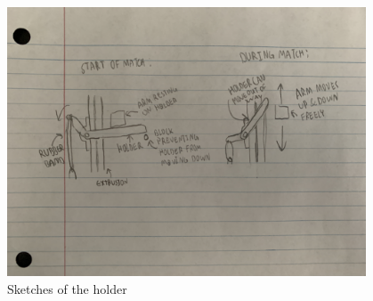\begin{figure}[htp]
\centering
  \includegraphics[width=0.95\textwidth]{Meetings/November/11-06-21/11-6-21_Hardware_Figure4 - Nathan Forrer.JPG}
  \caption{Sketches of the holder}
  \label{fig:110621_4}
\label{fig:110621_3}
\end{figure}



